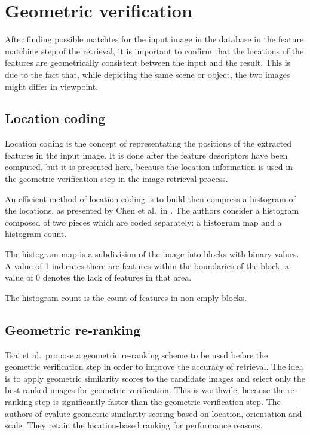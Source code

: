 \section{Geometric verification}
\label{sec:geometric_verification}

After finding possible matchtes for the input image in the database in the feature matching step of the retrieval, it is important to confirm that the locations of the features are geometrically consistent between the input and the result. This is due to the fact that, while depicting the same scene or object, the two images might differ in viewpoint.

\subsection{Location coding}

Location coding is the concept of representating the positions of the extracted features in the input image. It is done after the feature descriptors have been computed, but it is presented here, because the location information is used in the geometric verification step in the image retrieval process.

An efficient method of location coding is to build then compress a histogram of the locations, as presented by Chen et al.\ in \cite{chen2010inverted}. The authors consider a histogram composed of two pieces which are coded separately: a histogram map and a histogram count.

The histogram map is a subdivision of the image into blocks with binary values. A value of 1 indicates there are features within the boundaries of the block, a value of 0 denotes the lack of features in that area.

The histogram count is the count of features in non emply blocks.

\subsection{Geometric re-ranking}

Tsai et al.\ propose a geometric re-ranking scheme \cite{tsai2010fast} to be used before the geometric verification step in order to improve the accuracy of retrieval. The idea is to apply geometric similarity scores to the candidate images and select only the best ranked images for geometric verification. This is worthwile, because the re-ranking step is significantly faster than the geometric verification step. The authors of \cite{tsai2010fast} evalute geometric similarity scoring based on location, orientation and scale. They retain the location-based ranking for performance reasons.

